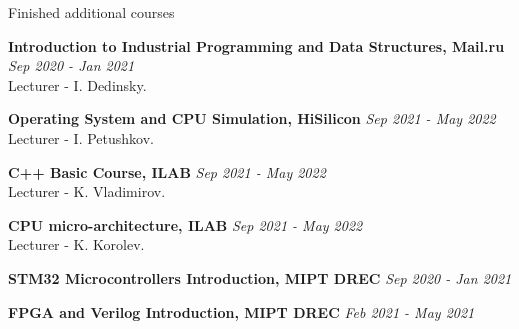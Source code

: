 \documentclass{resume} %
\begin{document}
\begin{rSection}{Finished additional courses}

{\bf Introduction to Industrial Programming and Data Structures, Mail.ru} \hfill
    {\em Sep 2020 - Jan 2021}
\\ Lecturer - I. Dedinsky.

{\bf Operating System and CPU Simulation, HiSilicon} \hfill {\em Sep 2021 - May 2022}
\\ Lecturer - I. Petushkov.

{\bf C++ Basic Course, ILAB} \hfill {\em Sep 2021 - May 2022}
\\ Lecturer - K. Vladimirov.

{\bf CPU micro-architecture, ILAB} \hfill {\em Sep 2021 - May 2022}
\\ Lecturer - K. Korolev.

\vspace{0.3cm}

{\bf STM32 Microcontrollers Introduction, MIPT DREC} \hfill {\em Sep 2020 - Jan 2021}

{\bf FPGA and Verilog Introduction, MIPT DREC} \hfill {\em Feb 2021 - May 2021}

\end{rSection}
\end{document}
